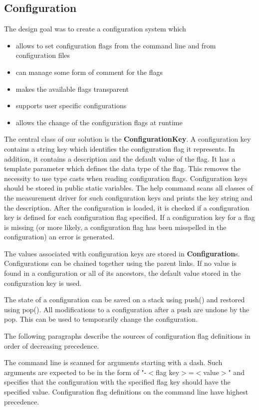 \documentclass[a4paper,12pt]{report}
\newlength{\imgwidth}
\newcommand{\umlDiagram}[1]{%
	\settowidth{\imgwidth}{\texttt{[image: out/diagrams/\#1.pdf]}}%
	\setlength{\imgwidth}{\minof{0.5\imgwidth}{\textwidth}}%
	\par\vskip0.5cm\noindent\makebox[\textwidth][c]{%
	\texttt{[image: out/diagrams/\#1.pdf]}%
}\vskip0.5cm}
\newcommand{\class}[1]{\textbf{#1}}
\newcommand{\method}[1]{\textsf{#1}}
\begin{document}
\subsection{Configuration}
The design goal was to create a configuration system which
\begin{itemize}
\item allows to set configuration flags from the command line and from
configuration files
\item can manage some form of comment for the flags
\item makes the available flags transparent
\item supports user specific configurations
\item allows the change of the configuration flags at runtime
\end{itemize}

\umlDiagram{measurementDriver/Configuration}
The central class of our solution is the \class{ConfigurationKey}. A
configuration key contains a string key which identifies the configuration flag it represents. In
addition, it contains a description and the default value of the flag. It has a
template parameter which defines the data type of the flag. This removes the
necessity to use type casts when reading configuration flags. Configuration keys
should be stored in public static variables. The help command scans all classes
of the measurement driver for such configuration keys and prints the key string
and the description. After the configuration is loaded, it is checked if a
configuration key is defined for each configuration flag specified. If a
configuration key for a flag is missing (or more likely, a configuration flag
has been misspelled in the configuration) an error is generated.

The values associated with configuration keys are stored in
\class{Configuration}s. Configurations can be chained together using the parent
links. If no value is found in a configuration or all of its ancestors, the
default value stored in the configuration key is used. 

The state of a configuration can be saved on a stack using \method{push()} and
restored using \method{pop()}. All modifications to a configuration after a push
are undone by the pop. This can be used to temporarily change the
configuration.

The following paragraphs describe the sources of configuration flag definitions
in order of decreasing precedence. 

The command line is scanned for arguments starting with a dash. Such arguments
are expected to be in the form of "-$<$flag key$>$=$<$value$>$" and specifies
that the configuration with the specified flag key should have the specified
value. Configuration flag definitions on the command line have highest
precedence.
\end{document}
